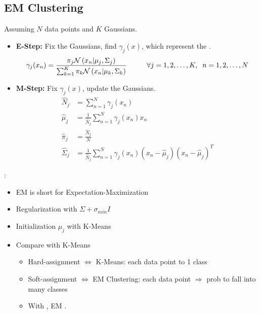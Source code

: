 \subsection{EM Clustering}
Assuming $N$ data points and $K$ Gaussians.
\begin{itemize}
	\item \textbf{E-Step:} Fix the Gaussians, find $\gamma_j(x)$, which represent the .
	\begin{equation}
		\gamma_j(x_n) = \frac{\pi_j \mathcal{N}\left(x_n|\mu_j,\Sigma_j\right)}
		{\sum_{k=1}^{K}\pi_k \mathcal{N}\left(x_n|\mu_k,\Sigma_k\right)} \hspace*{1cm} \forall j=1, 2, \dots, K, \;\; n=1, 2, \dots, N
	\end{equation}	
	\item \textbf{M-Step:} Fix $\gamma_j(x)$, update the Gaussians.
	\begin{align}
		\hat{N}_j &= \sum_{n=1}^{N}\gamma_j(x_n) \\
		\hat{\mu}_j &= \frac{1}{\hat{N}_j} \sum_{n=1}^{N} \gamma_j(x_n)x_n \\
		\hat{\pi}_j &= \frac{\hat{N}_j}{N} \\
		\hat{\Sigma}_j &= \frac{1}{\hat{N}_j} \sum_{n=1}^{N} \gamma_j(x_n) \left(x_n - \hat{\mu}_j\right)\left(x_n - \hat{\mu}_j\right)^T
	\end{align}
\end{itemize}
:
\begin{itemize}
	\item EM is short for Expectation-Maximization
	\item Regularization with $\Sigma + \sigma_{min}I$
	\item Initialization $\mu_j$ with K-Means
	\item Compare with K-Means
	\begin{itemize}
		\item Hard-assignment $\Leftrightarrow$ K-Means: each data point to 1 class
		\item Soft-assignment $\Leftrightarrow$ EM Clustering: each data point $\Rightarrow$ \ac{prob} to fall into many classes
		\item With , EM .
	\end{itemize}	
\end{itemize}